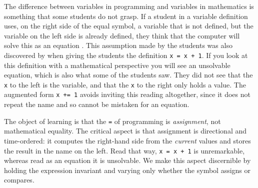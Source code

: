 The difference between variables in programming and variables in 
mathematics is something that some students do not grasp. If a student in a 
variable 
definition uses, on the right side of the equal symbol, a variable that is 
not 
defined, but the variable on the left side is already defined, they think 
that 
the computer will solve this as an equation \autocite{Plass2015Variables}. 
This assumption made by the students was also discovered by 
\textcite{Kohn2017VariableEvaluation} when giving the students the 
definition 
\texttt{x = x + 1}. If you look at this definition with a 
mathematical 
perspective you will see an unsolvable equation, which is also what some of 
the 
students saw. They did not see that the \texttt{x} to the left 
is the 
variable, 
and that the \texttt{x} to the right only holds a value. The
augmented form \texttt{x += 1} avoids inviting this reading
altogether, since it does not repeat the name and so cannot be mistaken for
an equation.

The object of learning is that the \texttt{=} of programming is
\emph{assignment}, not mathematical equality. The critical aspect is that
assignment is directional and time-ordered: it computes the right-hand side from
the \emph{current} values and stores the result in the name on the left. Read
that way, \texttt{x = x + 1} is unremarkable, whereas read as an
equation it is unsolvable. We make this aspect discernible by holding the
expression invariant and varying only whether the symbol assigns or compares.

